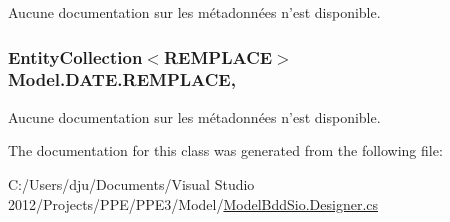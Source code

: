 Aucune documentation sur les métadonnées n'est disponible. 

\hypertarget{class_model_1_1_d_a_t_e_ab660780ffb5bef16c7c3632f69eaa926}{
\subsubsection[{R\-E\-M\-P\-L\-A\-C\-E}]{\setlength{\rightskip}{0pt plus 5cm}Entity\-Collection$<${\bf R\-E\-M\-P\-L\-A\-C\-E}$>$ Model.\-D\-A\-T\-E.\-R\-E\-M\-P\-L\-A\-C\-E\hspace{0.3cm}{\ttfamily [get]}, {\ttfamily [set]}}}\label{class_model_1_1_d_a_t_e_ab660780ffb5bef16c7c3632f69eaa926}


Aucune documentation sur les métadonnées n'est disponible. 



The documentation for this class was generated from the following file\-:\begin{DoxyCompactItemize}
\item 
C\-:/\-Users/dju/\-Documents/\-Visual Studio 2012/\-Projects/\-P\-P\-E/\-P\-P\-E3/\-Model/\hyperlink{_model_bdd_sio_8_designer_8cs}{Model\-Bdd\-Sio.\-Designer.\-cs}\end{DoxyCompactItemize}
